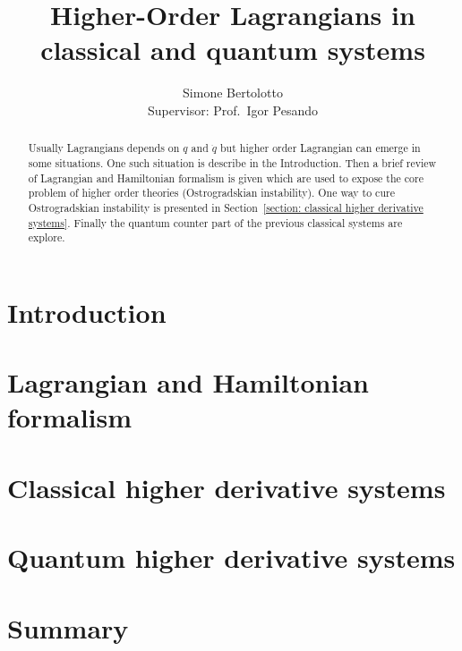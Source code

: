 \documentclass[a4paper]{article}
\title{Higher-Order Lagrangians in classical and quantum systems}
\author{Simone Bertolotto\\[1.0em]{\small Supervisor: Prof.\ Igor Pesando}}
\theoremstyle{definition}
\numberwithin{equation}{section}
\begin{document}
  \maketitle

  \begin{abstract}
    Usually Lagrangians depends on $q$ and $\dot{q}$ but higher order Lagrangian
    can emerge in some situations. One such situation is describe in the
    Introduction. Then a brief review of Lagrangian and Hamiltonian formalism
    is given which are used to expose the core problem of higher order
    theories (Ostrogradskian instability). One way to cure Ostrogradskian
    instability is presented in Section~\ref{section: classical higher
    derivative systems}. Finally the quantum counter part of the
    previous classical systems are explore.
  \end{abstract}

  \newpage

  \section{Introduction}\label{section: introduction}
  

  \section{Lagrangian and Hamiltonian formalism}\label{section: lagrangin and
  hamiltonian formalism}
  

  \section{Classical higher derivative systems}\label{section: classical higher
  derivative systems}
  

  \section{Quantum higher derivative systems}\label{section: quantum higher
  derivative systems}
  

  \newpage

  \section{Summary}\label{section: summary}
  
\end{document}
